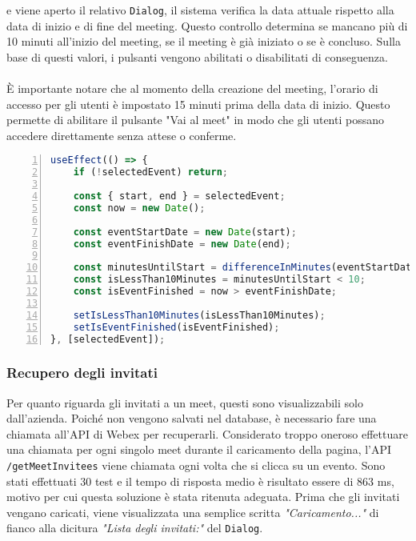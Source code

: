 e viene aperto il relativo \texttt{Dialog}, il sistema verifica la data attuale 
rispetto alla data di inizio e di fine del meeting. Questo controllo determina se mancano più di 10 
minuti all'inizio del meeting, se il meeting è già iniziato o se è concluso. Sulla base di questi valori, 
i pulsanti vengono abilitati o disabilitati di conseguenza.
\\ 
\\
È importante notare che al momento della creazione del meeting, 
l'orario di accesso per gli utenti è impostato 15 minuti prima della data di inizio. 
Questo permette di abilitare il pulsante "Vai al meet" in modo che gli utenti possano accedere 
direttamente senza attese o conferme.
\begin{lstlisting}[language=typescript, frame=lines, basicstyle=\ttfamily\scriptsize, numbers=left]
useEffect(() => {
    if (!selectedEvent) return;
      
    const { start, end } = selectedEvent;
    const now = new Date();
      
    const eventStartDate = new Date(start);
    const eventFinishDate = new Date(end);
      
    const minutesUntilStart = differenceInMinutes(eventStartDate, now);
    const isLessThan10Minutes = minutesUntilStart < 10;
    const isEventFinished = now > eventFinishDate;
      
    setIsLessThan10Minutes(isLessThan10Minutes);
    setIsEventFinished(isEventFinished);
}, [selectedEvent]);
\end{lstlisting}
\subsubsection{Recupero degli invitati}
Per quanto riguarda gli invitati a un meet, questi sono visualizzabili solo dall'azienda. 
Poiché non vengono salvati nel database, è necessario fare una chiamata all'API di Webex per recuperarli.
Considerato troppo oneroso effettuare una chiamata per ogni singolo meet durante il caricamento della 
pagina, l'API \texttt{/getMeetInvitees} viene chiamata ogni 
volta che si clicca su un evento. Sono stati effettuati 30 test e il tempo di risposta medio è 
risultato essere di 863 ms, motivo per cui questa soluzione è stata ritenuta adeguata. 
Prima che gli invitati vengano caricati, viene visualizzata 
una semplice scritta \textit{"Caricamento..."} di fianco alla dicitura \textit{"Lista degli invitati:"}
del \texttt{Dialog}.


